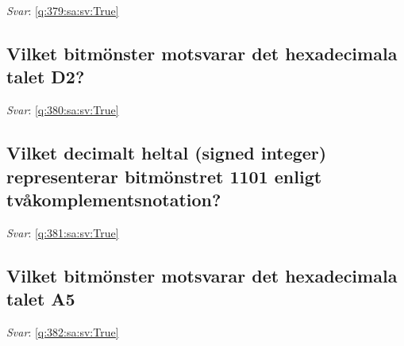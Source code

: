 \documentclass[a4paper,11pt,oneside]{article}
\begin{document}
\begin{sloppypar}
\label{q:379:sa:sv:False}

\vspace{2cm}

\noindent\makebox[\textwidth]{\hrulefill}

\vspace{1cm}

\textit{Svar}: \autoref{q:379:sa:sv:True}



\subsection{Vilket bitm\"onster motsvarar det hexadecimala talet D2?}

\label{q:380:sa:sv:False}

\vspace{2cm}

\noindent\makebox[\textwidth]{\hrulefill}

\vspace{1cm}

\textit{Svar}: \autoref{q:380:sa:sv:True}



\subsection{Vilket decimalt heltal (signed integer) representerar bitm\"onstret 1101 enligt tv\r{a}komplementsnotation?}

\label{q:381:sa:sv:False}

\vspace{2cm}

\noindent\makebox[\textwidth]{\hrulefill}

\vspace{1cm}

\textit{Svar}: \autoref{q:381:sa:sv:True}



\subsection{Vilket bitm\"onster motsvarar det hexadecimala talet A5}

\label{q:382:sa:sv:False}

\vspace{2cm}

\noindent\makebox[\textwidth]{\hrulefill}

\vspace{1cm}

\textit{Svar}: \autoref{q:382:sa:sv:True}




\end{sloppypar}
\end{document}
